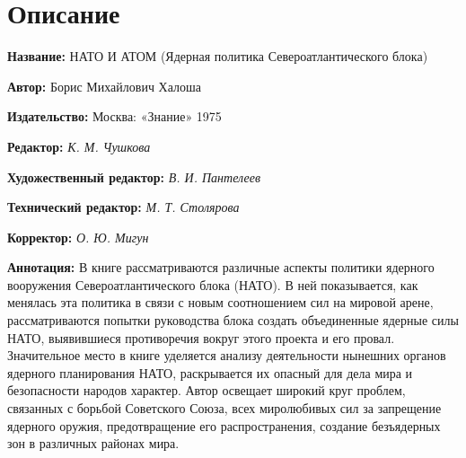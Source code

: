\documentclass[12pt, a4paper, openany]{book}
\begin{document}
	\newpage
	
	\setcounter{secnumdepth}{0}  
	
	
		\section*{Описание}
	
	{\bf Название:} НАТО И АТОМ (Ядерная политика Североатлантического блока) 
	
{\bf Автор:} Борис Михайлович Халоша
	
{\bf Издательство:} Москва: «Знание» 1975
	
		{\bf Редактор:} \textit{К. М. Чушкова}
	
		{\bf Художественный редактор:} \textit{В. И. Пантелеев}
	
		{\bf Технический редактор:} \textit{М. Т. Столярова}
	
		{\bf Корректор:} \textit{О. Ю. Мигун}
	
		{\bf Аннотация:} В книге рассматриваются различные аспекты политики ядерного вооружения Североатлантического блока (НАТО). В ней показывается, как менялась эта политика в связи с новым соотношением сил на мировой арене, рассматриваются попытки руководства блока создать объединенные ядерные силы НАТО, выявившиеся противоречия вокруг этого проекта и его провал. Значительное место в книге уделяется анализу деятельности нынешних органов ядерного планирования НАТО, раскрывается их опасный для дела мира и безопасности народов характер. Автор освещает широкий круг проблем, связанных с борьбой Советского Союза, всех миролюбивых сил за запрещение ядерного оружия, предотвращение его распространения, создание безъядерных зон в различных районах мира. 
		\thispagestyle{empty} %

	
\end{document}
